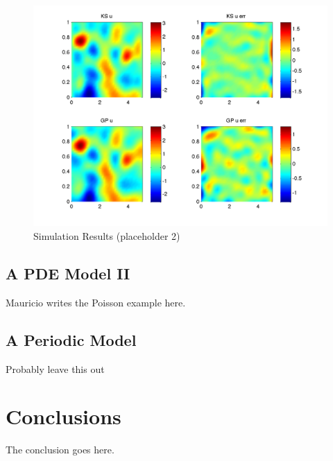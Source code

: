 \documentclass[journal]{IEEEtran}
\newcommand{\simo}[1]{{\color{red}#1}}
\begin{document}
\begin{figure}[!t]
\centering
\includegraphics[width=\columnwidth]{placeholder2}
\caption{Simulation Results (placeholder 2)}
\label{fig_sim}
\end{figure}

\subsection{A PDE Model II}

\simo{Mauricio writes the Poisson example here.}

\subsection{A Periodic Model}

\simo{Probably leave this out}

\section{Conclusions}
The conclusion goes here.





\end{document}
